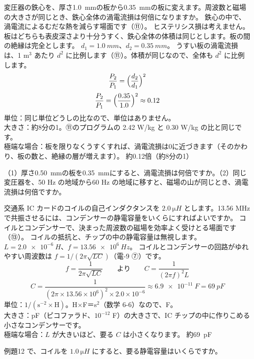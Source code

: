\label{ph:電-8:ex11}
\begin{phreidai}[鉄心の板をうすくする]
変圧器の鉄心を、厚さ\qty{1.0}{mm}の板から\qty{0.35}{mm}の板に変えます。周波数と磁場の大きさが同じとき、鉄心全体の渦電流損は何倍になりますか。
\phbamen
鉄心の中で、渦電流によるむだな熱を減らす場面です（⑪）。
\phmushi
ヒステリシス損は考えません。板はどちらも表皮深さより十分うすく、鉄心全体の体積は同じとします。板の間の絶縁は完全とします。
\phzu
$d_1=\qty{1.0}{mm}$、$d_2=\qty{0.35}{mm}$。
\phriyu
うすい板の渦電流損は、1 m$^3$ あたり $d^2$ に比例します（⑪）。体積が同じなので、全体も $d^2$ に比例します。
\phtateru
\[ \frac{P_2}{P_1}=\Bigl(\frac{d_2}{d_1}\Bigr)^2 \]
\phtoku
\[ \frac{P_2}{P_1}=\Bigl(\frac{0.35}{1.0}\Bigr)^2\approx0.12 \]
\phtashikame
単位：同じ単位どうしの比なので、単位はありません。\\
大きさ：約8分の1。⑪のプログラムの 2.42 W/kg と 0.30 W/kg の比と同じです。\\
極端な場合：板を限りなくうすくすれば、渦電流損は0に近づきます（そのかわり、板の数と、絶縁の層が増えます）。
\kotae 約0.12倍（約8分の1）
\end{phreidai}
\begin{jibun}
（1）厚さ\qty{0.50}{mm}の板を\qty{0.35}{mm}にすると、渦電流損は何倍ですか。（2）同じ変圧器を、50 Hz の地域から60 Hz の地域に移すと、磁場の山が同じとき、渦電流損は何倍ですか。
\end{jibun}

\label{ph:電-8:ex12}
\begin{phreidai}[IC カードのコイルと共振]
交通系 IC カードのコイルの自己インダクタンスを $\qty{2.0}{\micro H}$ とします。13.56 MHz で共振させるには、コンデンサーの静電容量をいくらにすればよいですか。
\phbamen
コイルとコンデンサーで、決まった周波数の磁場を効率よく受けとる場面です（⑬）。
\phmushi
コイルの抵抗と、チップの中の静電容量は無視します。
\phzu
$L=\qty{2.0e-6}{H}$、$f=\qty{13.56e6}{Hz}$。
\phriyu
コイルとコンデンサーの回路がゆれやすい周波数は $f=1/(2\pi\sqrt{LC})$（電-9 ⑦）です。
\phtateru
\[ f=\frac{1}{2\pi\sqrt{LC}}\qquad\text{より}\qquad C=\frac{1}{(2\pi f)^2L} \]
\phtoku
\[ C=\frac{1}{(2\pi\times13.56\times10^6)^2\times2.0\times10^{-6}}\approx\qty{6.9e-11}{F}=\qty{69}{pF} \]
\phtashikame
単位：$1/(\mathrm{s^{-2}}\times\mathrm{H})$。H×F＝s$^2$（数学 6-6）なので、F。\\
大きさ：pF（ピコファラド、$10^{-12}$ F）の大きさで、IC チップの中に作りこめる小さなコンデンサーです。\\
極端な場合：$L$ が大きいほど、要る $C$ は小さくなります。
\kotae 約\qty{69}{pF}
\end{phreidai}
\begin{jibun}
例題12 で、コイルを $\qty{1.0}{\micro H}$ にすると、要る静電容量はいくらですか。
\end{jibun}

